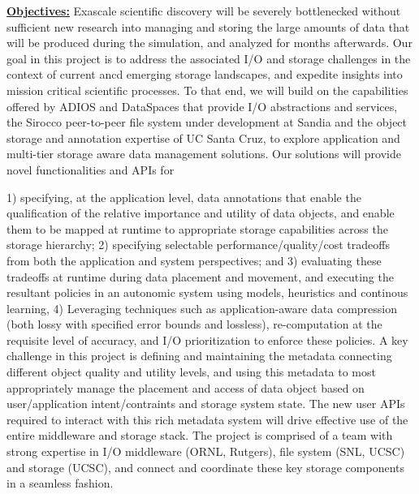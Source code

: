 \documentclass[11pt,letterpaper]{article}
\begin{document}
\underline{\textbf{Objectives:}} Exascale scientific discovery will be
severely bottlenecked without sufficient new research into managing and
storing the large amounts of data that will be produced during the
simulation, and analyzed for months afterwards.  Our goal in this project is
to address the associated I/O and storage challenges in the context of
current ancd emerging storage landscapes, and expedite insights into mission
critical scientific processes. To that end, we will build on the
capabilities offered by ADIOS and DataSpaces that provide I/O abstractions
and services, the Sirocco peer-to-peer file system under development at
Sandia and the object storage and annotation expertise of UC Santa Cruz, to
explore application and multi-tier storage aware data management
solutions. Our solutions will provide novel functionalities and APIs for




%
1) specifying, at the application level, data annotations that enable the
qualification of the relative importance and utility of data objects, and
enable them to be mapped at runtime to appropriate storage capabilities
across the storage hierarchy;
%
2) specifying selectable performance/quality/cost tradeoffs from both the
application and system perspectives; and
%
3) evaluating these tradeoffs at runtime during data placement and movement,
and executing the resultant policies in an autonomic system using models,
heuristics and continous learning,
%
4) Leveraging techniques such as application-aware data compression (both
lossy with specified error bounds and lossless), re-computation at the
requisite level of accuracy, and I/O prioritization to enforce these
policies.
A key challenge in this project is defining and maintaining the metadata
connecting different object quality and utility levels, and using this metadata 
to most appropriately manage the placement and access of data object based on 
user/application intent/contraints and storage system state.
The new user APIs required to interact with this rich metadata system will
drive effective use of the entire middleware and storage stack.  The project
is comprised of a team with strong expertise in I/O middleware (ORNL,
Rutgers), file system (SNL, UCSC) and storage (UCSC), and connect and
coordinate these key storage components in a seamless fashion.
\end{document}
